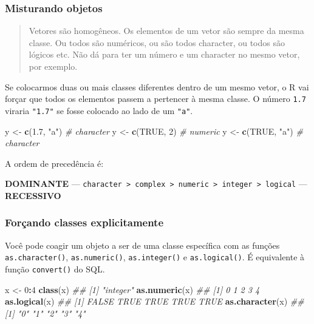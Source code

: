 \documentclass[]{book}
\newenvironment{Shaded}{\begin{snugshade}}{\end{snugshade}}
\newcommand{\CommentTok}[1]{\textcolor[rgb]{0.56,0.35,0.01}{\textit{#1}}}
\newcommand{\DecValTok}[1]{\textcolor[rgb]{0.00,0.00,0.81}{#1}}
\newcommand{\FloatTok}[1]{\textcolor[rgb]{0.00,0.00,0.81}{#1}}
\newcommand{\KeywordTok}[1]{\textcolor[rgb]{0.13,0.29,0.53}{\textbf{#1}}}
\newcommand{\NormalTok}[1]{#1}
\newcommand{\OperatorTok}[1]{\textcolor[rgb]{0.81,0.36,0.00}{\textbf{#1}}}
\newcommand{\OtherTok}[1]{\textcolor[rgb]{0.56,0.35,0.01}{#1}}
\newcommand{\StringTok}[1]{\textcolor[rgb]{0.31,0.60,0.02}{#1}}
\begin{document}
\hypertarget{misturando-objetos}{%
\subsubsection{Misturando objetos}\label{misturando-objetos}}

\begin{quote}
Vetores são homogêneos. Os elementos de um vetor são sempre da mesma classe. Ou todos são numéricos, ou são todos character, ou todos são lógicos etc. Não dá para ter um número e um character no mesmo vetor, por exemplo.
\end{quote}

Se colocarmos duas ou mais classes diferentes dentro de um mesmo vetor, o R vai forçar que todos os elementos passem a pertencer à mesma classe. O número \texttt{1.7} viraria \texttt{"1.7"} se fosse colocado ao lado de um \texttt{"a"}.

\begin{Shaded}
\begin{Highlighting}[]
\NormalTok{y <-}\StringTok{ }\KeywordTok{c}\NormalTok{(}\FloatTok{1.7}\NormalTok{, }\StringTok{"a"}\NormalTok{)  }\CommentTok{# character}
\NormalTok{y <-}\StringTok{ }\KeywordTok{c}\NormalTok{(}\OtherTok{TRUE}\NormalTok{, }\DecValTok{2}\NormalTok{)   }\CommentTok{# numeric}
\NormalTok{y <-}\StringTok{ }\KeywordTok{c}\NormalTok{(}\OtherTok{TRUE}\NormalTok{, }\StringTok{"a"}\NormalTok{) }\CommentTok{# character}
\end{Highlighting}
\end{Shaded}

A ordem de precedência é:

\textbf{DOMINANTE} --- \texttt{character\ \textgreater{}\ complex\ \textgreater{}\ numeric\ \textgreater{}\ integer\ \textgreater{}\ logical} --- \textbf{RECESSIVO}

\hypertarget{foruxe7ando-classes-explicitamente}{%
\subsubsection{Forçando classes explicitamente}\label{foruxe7ando-classes-explicitamente}}

Você pode coagir um objeto a ser de uma classe específica com as funções \texttt{as.character()}, \texttt{as.numeric()}, \texttt{as.integer()} e \texttt{as.logical()}. É equivalente à função \texttt{convert()} do SQL.

\begin{Shaded}
\begin{Highlighting}[]
\NormalTok{x <-}\StringTok{ }\DecValTok{0}\OperatorTok{:}\DecValTok{4}
\KeywordTok{class}\NormalTok{(x)}
\CommentTok{## [1] "integer"}
\KeywordTok{as.numeric}\NormalTok{(x)}
\CommentTok{## [1] 0 1 2 3 4}
\KeywordTok{as.logical}\NormalTok{(x)}
\CommentTok{## [1] FALSE  TRUE  TRUE  TRUE  TRUE}
\KeywordTok{as.character}\NormalTok{(x)}
\CommentTok{## [1] "0" "1" "2" "3" "4"}
\end{Highlighting}
\end{Shaded}
\end{document}
